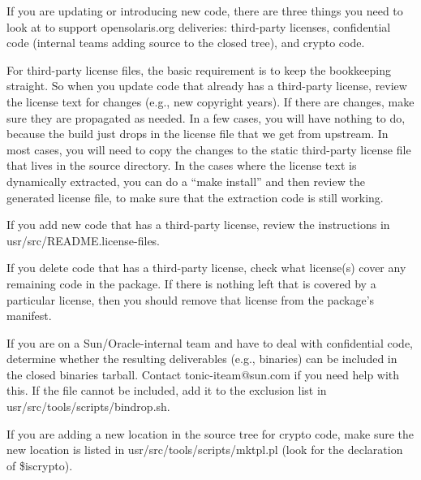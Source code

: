 \documentclass{article}
\begin{document}
If you are updating or introducing new code, there are three things you need to
look at to support opensolaris.org deliveries: third-party licenses,
confidential code (internal teams adding source to the closed tree), and crypto
code.

For third-party license files, the basic requirement is to keep the bookkeeping
straight.  So when you update code that already has a third-party license,
review the license text for changes (e.g., new copyright years).  If there are
changes, make sure they are propagated as needed.  In a few cases, you will have
nothing to do, because the build just drops in the license file that we get from
upstream.  In most cases, you will need to copy the changes to the static
third-party license file that lives in the source directory.  In the cases where
the license text is dynamically extracted, you can do a ``make install'' and
then review the generated license file, to make sure that the extraction code is
still working.

If you add new code that has a third-party license, review the instructions in
usr/src/README.license-files.

If you delete code that has a third-party license, check what license(s) cover
any remaining code in the package.  If there is nothing left that is covered by
a particular license, then you should remove that license from the package's
manifest.

If you are on a Sun/Oracle-internal team and have to deal with confidential
code, determine whether the resulting deliverables (e.g., binaries) can be
included in the closed binaries tarball.  Contact tonic-iteam@sun.com if you
need help with this.  If the file cannot be included, add it to the exclusion
list in usr/src/tools/scripts/bindrop.sh.

If you are adding a new location in the source tree for crypto code, make sure
the new location is listed in usr/src/tools/scripts/mktpl.pl (look for the
declaration of \$iscrypto).
\end{document}
